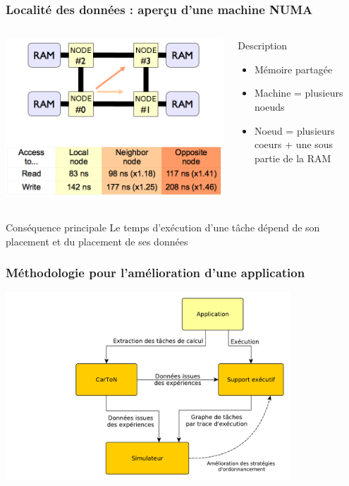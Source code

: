 \documentclass[xcolor={usenames,dvipsnames,svgnames,table}, aspectratio=43]{beamer}
\begin{document}
\begin{frame}
\frametitle{Localité des données : aperçu d'une machine NUMA}
\begin{columns}[T,onlytextwidth]
  \includegraphics[scale=0.3]{graph/NUMA-latences}

  \begin{block}{Description}
    \begin{itemize}
      \item Mémoire partagée
      \item Machine = plusieurs noeuds
      \item Noeud = plusieurs coeurs + une sous partie de la RAM
    \end{itemize}
  \end{block}

\end{columns}
\begin{alertblock}{Conséquence principale}
  Le temps d'exécution d'une tâche dépend de son placement et du placement de ses données
\end{alertblock}

\end{frame}


\begin{frame}
  \frametitle{Méthodologie pour l'amélioration d'une application}
  \includegraphics[width=0.8\textwidth]{graph/big_picture.pdf}
\end{frame}
\end{document}
